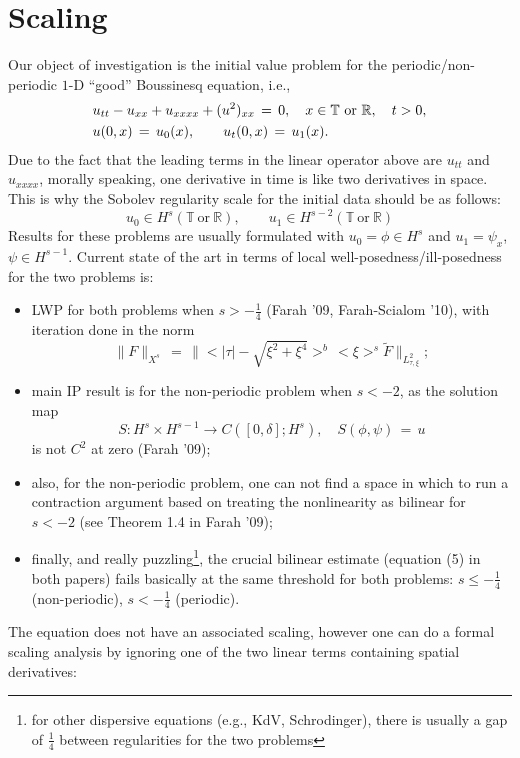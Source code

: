 \documentclass[12pt,reqno]{amsart}
\numberwithin{equation}{section}  %
\begin{document}
\section{Scaling} 
\label{sec:scaling}
Our object of investigation is the initial value problem for the
periodic/non-periodic $1$-D ``good'' Boussinesq equation, i.e.,
\begin{equation}
\aligned
& u_{tt}-u_{xx}+u_{xxxx}+ (u^2)_{xx}\,=\,0, \quad x\in \mathbb{T}\ \text{or} \ \mathbb{R}, \quad t>0,\\
&u(0,x)\,=\,u_0(x),\qquad u_t(0,x)\,=\,u_1(x).\endaligned
\label{main}
\end{equation}
Due to the fact that the leading terms in the linear operator above are $u_{tt}$ and $u_{xxxx}$, morally speaking, one derivative in time is like two derivatives in space. This is why the Sobolev regularity scale for the initial data should be as follows:
\[
u_0\in H^s(\mathbb{T}\ \text{or} \ \mathbb{R}), \qquad u_1\in H^{s-2}(\mathbb{T}\ \text{or} \ \mathbb{R})
\]
Results for these problems are usually formulated with $u_0=\phi \in H^s$ and $u_1=\psi_x$, $\psi\in H^{s-1}$.
Current state of the art in terms of local well-posedness/ill-posedness for the two problems is:
\begin{itemize}
\item LWP for both problems when $s>-\frac 14$ (Farah '09, Farah-Scialom '10), with iteration done in
the norm
\[
\|F\|_{X^{s}}\,=\,\|<|\tau|-\sqrt{\xi^2+\xi^4}>^b\,<\xi>^s \tilde{F}\|_{L^2_{\tau,\xi}};
\]
\item main IP result is for the non-periodic problem when $s<-2$, as the solution map 
\[
S: H^s\times H^{s-1} \to C([0,\delta]; H^s), \quad
S(\phi,\psi)\,=\,u
\]
is not $C^2$ at zero (Farah '09);
\item also, for the non-periodic problem, one can not find a space in which to run a contraction argument based on treating the nonlinearity as bilinear for $s<-2$ (see Theorem 1.4 in Farah '09);
\item finally, and really puzzling\footnote{for other dispersive equations (e.g., KdV, Schrodinger), there is usually a gap of $\frac 14$ between regularities for the two problems}, the crucial bilinear estimate (equation (5) in both papers) fails basically at the same threshold for both problems: $s\leq -\frac 14$ (non-periodic), $s<-\frac{1}{4}$ (periodic).
\end{itemize}
The equation does not have an associated scaling, however one can do a formal scaling analysis by ignoring one of the two linear terms containing spatial derivatives:
\end{document}
